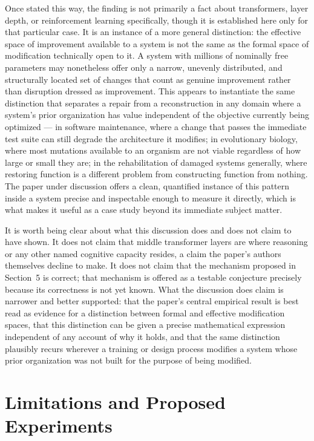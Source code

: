 \documentclass[11pt]{article}
\begin{document}
Once stated this way, the finding is not primarily a fact about transformers, layer depth, or reinforcement learning specifically, though it is established here only for that particular case. It is an instance of a more general distinction: the effective space of improvement available to a system is not the same as the formal space of modification technically open to it. A system with millions of nominally free parameters may nonetheless offer only a narrow, unevenly distributed, and structurally located set of changes that count as genuine improvement rather than disruption dressed as improvement. This appears to instantiate the same distinction that separates a repair from a reconstruction in any domain where a system's prior organization has value independent of the objective currently being optimized --- in software maintenance, where a change that passes the immediate test suite can still degrade the architecture it modifies; in evolutionary biology, where most mutations available to an organism are not viable regardless of how large or small they are; in the rehabilitation of damaged systems generally, where restoring function is a different problem from constructing function from nothing. The paper under discussion offers a clean, quantified instance of this pattern inside a system precise and inspectable enough to measure it directly, which is what makes it useful as a case study beyond its immediate subject matter.

It is worth being clear about what this discussion does and does not claim to have shown. It does not claim that middle transformer layers are where reasoning or any other named cognitive capacity resides, a claim the paper's authors themselves decline to make. It does not claim that the mechanism proposed in Section~5 is correct; that mechanism is offered as a testable conjecture precisely because its correctness is not yet known. What the discussion does claim is narrower and better supported: that the paper's central empirical result is best read as evidence for a distinction between formal and effective modification spaces, that this distinction can be given a precise mathematical expression independent of any account of why it holds, and that the same distinction plausibly recurs wherever a training or design process modifies a system whose prior organization was not built for the purpose of being modified.

\section{Limitations and Proposed Experiments}
\end{document}
